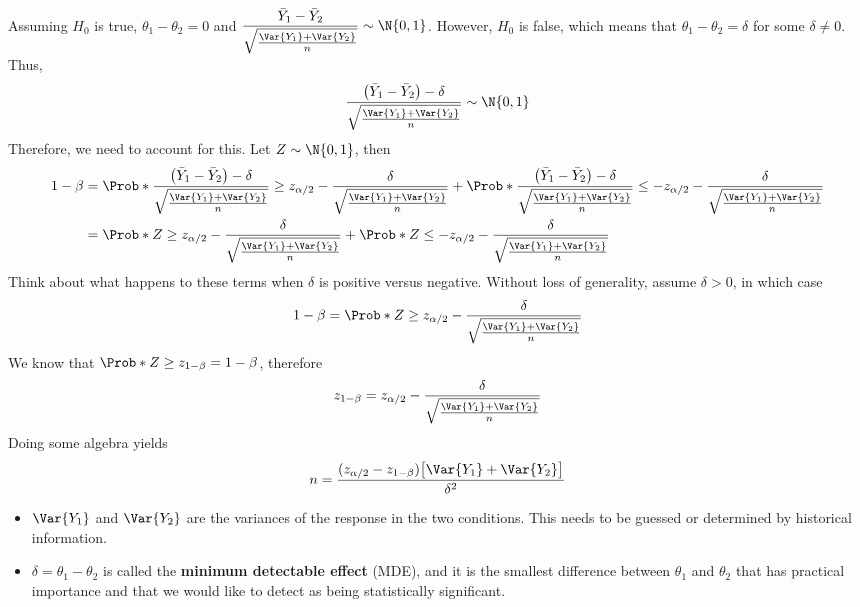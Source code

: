 Assuming $ H_0 $ is true, $ \theta_1-\theta_2=0 $ and $ \displaystyle \frac{\bar{Y}_1-\bar{Y}_2}{\sqrt{\frac{\Var{Y_1}+\Var{Y_2}}{n}}} \sim \N{0,1} $.
However, $ H_0 $ is false, which means that $ \theta_1-\theta_2=\delta $ for some $ \delta\ne 0 $. Thus,
\[ \frac{\bigl(\bar{Y}_1-\bar{Y}_2\bigr)-\delta}{\sqrt{\frac{\Var{Y_1}+\Var{Y_2}}{n}}}\sim \N{0,1}  \]
Therefore, we need to account for this. Let $ Z \sim \N{0,1} $, then
\begin{align*}
      1-\beta
       & =\Prob*{\frac{\bigl(\bar{Y}_1-\bar{Y}_2\bigr)-\delta}{\sqrt{\frac{\Var{Y_1}+\Var{Y_2}}{n}}}\ge z_{\alpha/2}-\frac{\delta}{\sqrt{\frac{\Var{Y_1}+\Var{Y_2}}{n}}}}+\Prob*{\frac{\bigl(\bar{Y}_1-\bar{Y}_2\bigr)-\delta}{\sqrt{\frac{\Var{Y_1}+\Var{Y_2}}{n}}}\le -z_{\alpha/2}-\frac{\delta}{\sqrt{\frac{\Var{Y_1}+\Var{Y_2}}{n}}}} \\
       & =\Prob*{Z\ge z_{\alpha/2}-\frac{\delta}{\sqrt{\frac{\Var{Y_1}+\Var{Y_2}}{n}}}}+\Prob*{Z\le -z_{\alpha/2}-\frac{\delta}{\sqrt{\frac{\Var{Y_1}+\Var{Y_2}}{n}}}}
\end{align*}
Think about what happens to these terms when $ \delta $ is positive versus negative.
Without loss of generality, assume $ \delta>0 $, in which case
\[ 1-\beta=\Prob*{Z\ge z_{\alpha/2}-\frac{\delta}{\sqrt{\frac{\Var{Y_1}+\Var{Y_2}}{n}}}} \]
We know that $ \Prob*{Z\ge z_{1-\beta}}=1-\beta $, therefore
\[ z_{1-\beta}=z_{\alpha/2}-\frac{\delta}{\sqrt{\frac{\Var{Y_1}+\Var{Y_2}}{n}}} \]
Doing some algebra yields
\[ n=\frac{(z_{\alpha/2}-z_{1-\beta})\bigl[\Var{Y_1}+\Var{Y_2}\bigr]}{\delta^2}  \]
\begin{itemize}
      \item $ \Var{Y_1} $ and $ \Var{Y_2} $ are the variances of the response in the two conditions.
            This needs to be guessed or determined by historical information.
      \item $ \delta=\theta_1-\theta_2 $ is called the \textbf{minimum detectable effect} (MDE), and it
            is the smallest difference between $ \theta_1 $ and $ \theta_2 $ that has practical importance
            and that we would like to detect as being statistically significant.
\end{itemize}
